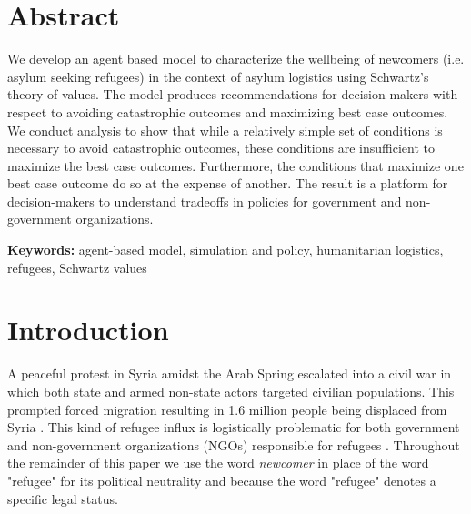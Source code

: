 \documentclass{scspaperproc}
\theoremstyle{scsthe}
\begin{document}
\maketitle

\section*{Abstract}

We develop an agent based model to characterize the wellbeing of newcomers (i.e. asylum seeking refugees) in the context of asylum logistics using Schwartz's theory of values. The model produces recommendations for decision-makers with respect to avoiding catastrophic outcomes and maximizing best case outcomes. We conduct analysis to show that while a relatively simple set of conditions is necessary to avoid catastrophic outcomes, these conditions are insufficient to maximize the best case outcomes. Furthermore, the conditions that maximize one best case outcome do so at the expense of another. The result is a platform for decision-makers to understand tradeoffs in policies for government and non-government organizations.

\textbf{Keywords:} agent-based model, simulation and policy, humanitarian logistics, refugees, Schwartz values

\section{Introduction}
\label{sec:intro}
A peaceful protest in Syria amidst the Arab Spring escalated into a civil war in which both state and armed non-state actors targeted civilian populations. This prompted forced migration resulting in 1.6 million people being displaced from Syria \cite{42,90}. This kind of refugee influx is logistically problematic for both government and non-government organizations (NGOs) responsible for refugees \cite{66}. Throughout the remainder of this paper we use the word \emph{newcomer} in place of the word "refugee" for its political neutrality and because the word "refugee" denotes a specific legal status. 

\end{document}
